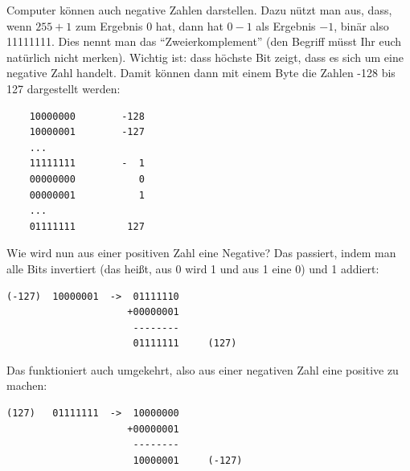 Computer können auch negative Zahlen darstellen. Dazu nützt man aus, dass, wenn $255 + 1$ zum Ergebnis $0$ hat, dann hat $0-1$ als Ergebnis $-1$, binär also 11111111. Dies nennt man das ``Zweierkomplement'' (den Begriff müsst Ihr euch natürlich nicht merken). Wichtig ist: dass höchste Bit zeigt, dass es sich um eine negative Zahl handelt. Damit können dann mit einem Byte die Zahlen -128 bis 127 dargestellt werden:
\begin{lstlisting}
    10000000        -128
    10000001        -127
    ...
    11111111        -  1
    00000000           0
    00000001           1
    ...
    01111111         127
\end{lstlisting}
Wie wird nun aus einer positiven Zahl eine Negative? Das passiert, indem man alle Bits invertiert (das heißt, aus 0 wird 1 und aus 1 eine 0) und 1 addiert:
\begin{lstlisting}
(-127)  10000001  ->  01111110
                     +00000001
                      --------
                      01111111     (127)
\end{lstlisting}
Das funktioniert auch umgekehrt, also aus einer negativen Zahl eine positive zu machen:
\begin{lstlisting}
(127)   01111111  ->  10000000
                     +00000001
                      --------
                      10000001     (-127)
\end{lstlisting}

